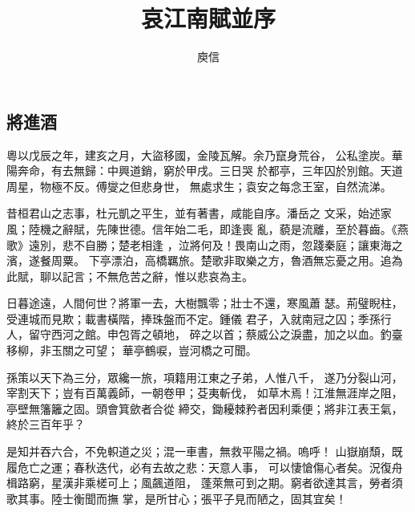 \documentclass[12pt]{article}
\begin{document}
\begin{CJK*}{UTF8}{song}

\title{哀江南賦並序}
\author{庾信}
\date{}
\maketitle \tableofcontents
\section{將進酒}
粵以戊辰之年，建亥之月，大盜移國，金陵瓦解。余乃竄身荒谷，
公私塗炭。華陽奔命，有去無歸：中興道銷，窮於甲戌。三日哭
於都亭，三年囚於別館。天道周星，物極不反。傅燮之但悲身世，
無處求生；袁安之每念王室，自然流涕。

昔桓君山之志事，杜元凱之平生，並有著書，咸能自序。潘岳之
文采，始述家風；陸機之辭賦，先陳世德。信年始二毛，即逢喪
亂，藐是流離，至於暮齒。《燕歌》遠別，悲不自勝；楚老相逢
，泣將何及！畏南山之雨，忽踐秦庭；讓東海之濱，遂餐周粟。
下亭漂泊，高橋羈旅。楚歌非取樂之方，魯酒無忘憂之用。追為
此賦，聊以記言；不無危苦之辭，惟以悲哀為主。

日暮途遠，人間何世？將軍一去，大樹飄零；壯士不還，寒風蕭
瑟。荊璧睨柱，受連城而見欺；載書橫階，捧珠盤而不定。鍾儀
君子，入就南冠之囚；季孫行人，留守西河之館。申包胥之頓地，
碎之以首；蔡威公之淚盡，加之以血。釣臺移柳，非玉關之可望；
華亭鶴唳，豈河橋之可聞。

孫策以天下為三分，眾纔一旅，項籍用江東之子弟，人惟八千，
遂乃分裂山河，宰割天下；豈有百萬義師，一朝卷甲；芟夷斬伐，
如草木焉！江淮無涯岸之阻，亭壁無籓籬之固。頭會箕歛者合從
締交，鋤耰棘矜者因利乘便；將非江表王氣，終於三百年乎？

是知并吞六合，不免軹道之災；混一車書，無救平陽之禍。嗚呼！
山嶽崩頹，既履危亡之運；春秋迭代，必有去故之悲：天意人事，
可以悽愴傷心者矣。況復舟楫路窮，星漢非乘槎可上；風飆道阻，
蓬萊無可到之期。窮者欲達其言，勞者須歌其事。陸士衡聞而撫
掌，是所甘心；張平子見而陋之，固其宜矣！

\end{CJK*}
\end{document}
